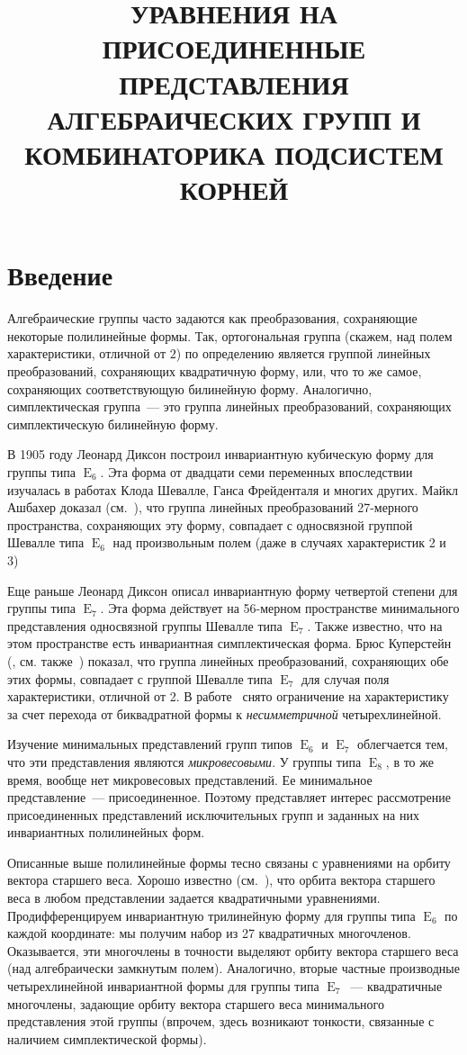 \documentclass[a4paper,12pt]{amsart}
\title[]
{УРАВНЕНИЯ НА ПРИСОЕДИНЕННЫЕ ПРЕДСТАВЛЕНИЯ АЛГЕБРАИЧЕСКИХ ГРУПП И КОМБИНАТОРИКА ПОДСИСТЕМ КОРНЕЙ}
\date{}
\def\E{\operatorname{E}}
\theoremstyle{plain}
\theoremstyle{remark}
\theoremstyle{definition}
\begin{document}
\maketitle
\section*{Введение}

Алгебраические группы часто задаются как преобразования, сохраняющие
некоторые полилинейные формы. Так, ортогональная группа
(скажем, над полем характеристики, отличной от $2$) по определению
является группой линейных преобразований, сохраняющих квадратичную форму,
или, что то же самое, сохраняющих соответствующую билинейную форму.
Аналогично, симплектическая группа~--- это группа линейных преобразований,
сохраняющих симплектическую билинейную форму.

В 1905 году Леонард Диксон построил инвариантную кубическую форму для группы
типа $\E_6$. Эта форма от двадцати семи переменных
впоследствии изучалась в работах Клода Шевалле,
Ганса Фрейденталя и многих других. Майкл Ашбахер доказал
(см.~\cite{Aschbacher_e6}), что группа линейных
преобразований 27-мерного пространства, сохраняющих эту форму, совпадает
с односвязной группой Шевалле типа $\E_6$ над произвольным полем (даже в случаях
характеристик 2 и 3)

Еще раньше Леонард Диксон описал инвариантную форму четвертой степени для группы
типа $\E_7$. Эта форма действует на 56-мерном пространстве минимального
представления односвязной группы Шевалле типа $\E_7$. Также известно, что на
этом пространстве есть инвариантная симплектическая форма.
Брюс Куперстейн (\cite{Cooperstein_E7}, см. также~\cite{Aschbacher_multi})
показал, что группа линейных преобразований, сохраняющих обе
этих формы, совпадает с группой Шевалле типа $\E_7$ для случая поля
характеристики, отличной от 2. В работе~\cite{Luzgarev_e7_invariants}
снято ограничение на характеристику
за счет перехода от биквадратной формы к {\em несимметричной} четырехлинейной.

Изучение минимальных представлений групп типов $\E_6$ и $\E_7$ облегчается тем,
что эти представления являются {\em микровесовыми}. У группы типа $\E_8$, в то же
время, вообще нет микровесовых представлений. Ее минимальное представление~---
присоединенное. Поэтому представляет интерес рассмотрение присоединенных
представлений исключительных групп и заданных на них инвариантных полилинейных форм.

Описанные выше полилинейные формы тесно связаны с уравнениями на орбиту вектора
старшего веса. Хорошо известно (см.~\cite{Lichtenstein}), что орбита вектора старшего веса
в любом представлении задается квадратичными уравнениями.
Продифференцируем инвариантную трилинейную форму для группы типа $\E_6$ по каждой
координате: мы получим набор из 27 квадратичных многочленов. Оказывается,
эти многочлены в точности выделяют орбиту вектора старшего веса (над алгебраически
замкнутым полем). Аналогично, вторые частные производные четырехлинейной инвариантной
формы для группы типа $\E_7$~--- квадратичные многочлены, задающие орбиту
вектора старшего веса минимального представления этой группы (впрочем, здесь
возникают тонкости, связанные с наличием симплектической формы).
\end{document}
